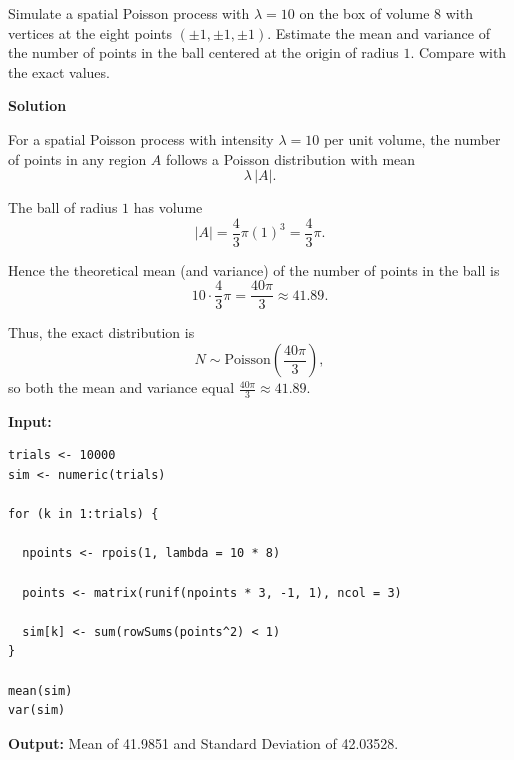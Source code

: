 \documentclass[hidelinks]{article}
\begin{document}
\noindent Simulate a spatial Poisson process with $\lambda = 10$ 
on the box of volume $8$ with vertices at the eight points 
$(\pm 1, \pm 1, \pm 1)$. Estimate the mean and variance of the number 
of points in the ball centered at the origin of radius $1$. 
Compare with the exact values.

\noindent \textbf{Solution}

\noindent For a spatial Poisson process with intensity $\lambda = 10$ per unit volume,
the number of points in any region $A$ follows a Poisson distribution with
mean
\[
\lambda \, |A|.
\]

\noindent The ball of radius $1$ has volume
\[
|A| = \frac{4}{3}\pi (1)^3 = \frac{4}{3}\pi.
\]

\noindent Hence the theoretical mean (and variance) of the number of points in the ball is
\[
10 \cdot \frac{4}{3}\pi = \frac{40\pi}{3} \approx 41.89.
\]

\noindent Thus, the exact distribution is
\[
N \sim \text{Poisson}\!\left(\frac{40\pi}{3}\right),
\]
so both the mean and variance equal $\frac{40\pi}{3} \approx 41.89$.

\noindent \textbf{Input:}

\begin{lstlisting}[caption={Exercise 6.43}]
trials <- 10000
sim <- numeric(trials)

for (k in 1:trials) {
  
  npoints <- rpois(1, lambda = 10 * 8)
  
  points <- matrix(runif(npoints * 3, -1, 1), ncol = 3)
  
  sim[k] <- sum(rowSums(points^2) < 1)
}

mean(sim)
var(sim)
\end{lstlisting}

\noindent \textbf{Output:} Mean of 41.9851 and Standard Deviation of 42.03528.
\end{document}
